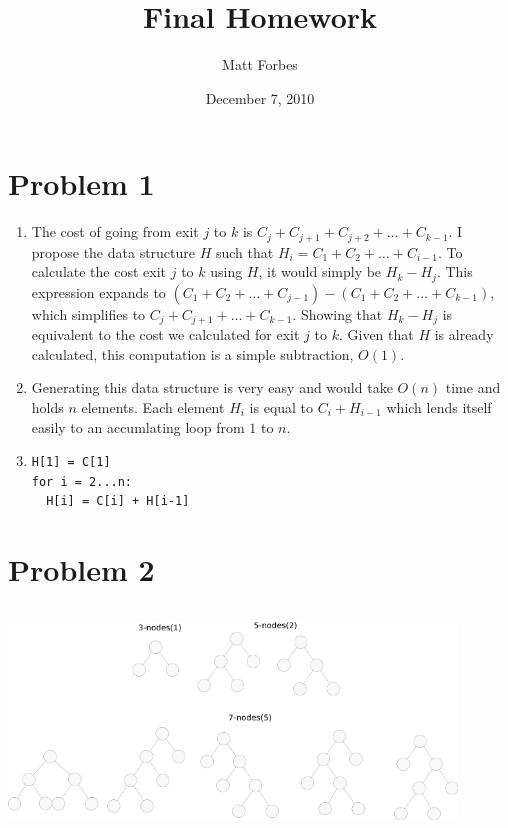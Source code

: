 \documentclass[a4paper,12pt]{article}
\begin{document}
\title{Final Homework}
\author{Matt Forbes}
\date{December 7, 2010}
\maketitle

\section*{Problem 1}

\begin{enumerate}[]
  
\item The cost of going from exit $j$ to $k$ is $C_j + C_{j+1} +
  C_{j+2} + \dots + C_{k-1}$. I propose the data structure $H$ such
  that $H_i = C_1 + C_2 + \dots + C_{i-1}$. To calculate the cost exit
  $j$ to $k$ using $H$, it would simply be $H_k - H_j$. This
  expression expands to $(C_1 + C_2 + \dots + C_{j-1}) - (C_1 + C_2 +
  \dots + C_{k-1})$, which simplifies to $C_j + C_{j+1} + \dots +
  C_{k-1}$. Showing that $H_k - H_j$ is equivalent to the cost we
  calculated for exit $j$ to $k$. Given that $H$ is already
  calculated, this computation is a simple subtraction, $O(1)$.

\item Generating this data structure is very easy and would take
  $O(n)$ time and holds $n$ elements. Each element $H_i$ is equal to
  $C_i + H_{i-1}$ which lends itself easily to an accumlating loop
  from $1$ to $n$.

\item
\begin{verbatim}
H[1] = C[1]
for i = 2...n:
  H[i] = C[i] + H[i-1]
\end{verbatim}
  
\end{enumerate}

\section*{Problem 2}

\begin{center}
  \includegraphics[width=450px, height=225px, keepaspectratio=true]{image/fulltrees.png}
\end{center}
\end{document}
